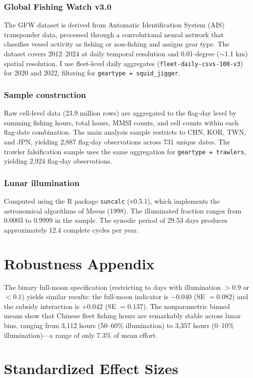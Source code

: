 \documentclass[12pt]{article}
\begin{document}
\subsubsection*{Global Fishing Watch v3.0} The GFW dataset is derived from Automatic Identification System (AIS) transponder data, processed through a convolutional neural network that classifies vessel activity as fishing or non-fishing and assigns gear type. The dataset covers 2012--2024 at daily temporal resolution and 0.01-degree ($\sim$1.1 km) spatial resolution. I use fleet-level daily aggregates (\texttt{fleet-daily-csvs-100-v3}) for 2020 and 2022, filtering for \texttt{geartype = squid\_jigger}.

\subsubsection*{Sample construction} Raw cell-level data (23.9 million rows) are aggregated to the flag-day level by summing fishing hours, total hours, MMSI counts, and cell counts within each flag-date combination. The main analysis sample restricts to CHN, KOR, TWN, and JPN, yielding 2,887 flag-day observations across 731 unique dates. The trawler falsification sample uses the same aggregation for \texttt{geartype = trawlers}, yielding 2,924 flag-day observations.

\subsubsection*{Lunar illumination} Computed using the R package \texttt{suncalc} (v0.5.1), which implements the astronomical algorithms of Meeus (1998). The illuminated fraction ranges from 0.0003 to 0.9999 in the sample. The synodic period of 29.53 days produces approximately 12.4 complete cycles per year.

\section{Robustness Appendix}

The binary full-moon specification (restricting to days with illumination $>0.9$ or $<0.1$) yields similar results: the full-moon indicator is $-0.040$ (SE $= 0.082$) and the subsidy interaction is $+0.042$ (SE $= 0.137$). The nonparametric binned means show that Chinese fleet fishing hours are remarkably stable across lunar bins, ranging from 3,112 hours (50--60\% illumination) to 3,357 hours (0--10\% illumination)---a range of only 7.3\% of mean effort.

\section{Standardized Effect Sizes}
\label{sec:sde}


\end{document}
